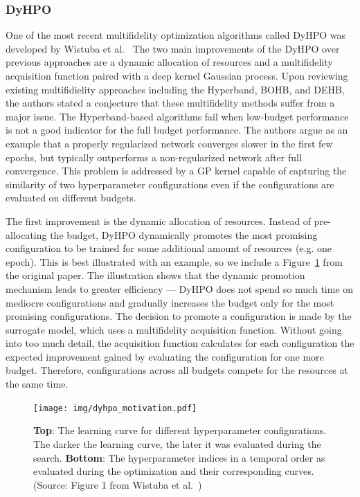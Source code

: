 \subsubsection{DyHPO}
One of the most recent multifidelity optimization algorithms called DyHPO was developed by Wistuba et al.~\cite{wistuba2022supervising} The two main improvements of the DyHPO over previous approaches are a dynamic allocation of resources and a multifidelity acquisition function paired with a deep kernel Gaussian process. Upon reviewing existing multifidielity approaches including the Hyperband, BOHB, and DEHB, the authors stated a conjecture that these multifidelity methods suffer from a major issue. The Hyperband-based algorithms fail when low-budget performance is not a good indicator for the full budget performance. The authors argue as an example that a properly regularized network converges slower in the first few epochs, but typically outperforms a non-regularized network after full convergence. This problem is addressed by a GP kernel capable of capturing the similarity of two hyperparameter configurations even if the configurations are evaluated on different budgets.

The first improvement is the dynamic allocation of resources. Instead of pre-allocating the budget, DyHPO dynamically promotes the most promising configuration to be trained for some additional amount of resources (e.g. one epoch). This is best illustrated with an example, so we include a Figure~\ref{fig:dyhpo_motivation} from the original paper. The illustration shows that the dynamic promotion mechanism leads to greater efficiency --- DyHPO does not spend so much time on mediocre configurations and gradually increases the budget only for the most promising configurations. The decision to promote a configuration is made by the surrogate model, which uses a multifidelity acquisition function. Without going into too much detail, the acquisition function calculates for each configuration the expected improvement gained by evaluating the configuration for one more budget. Therefore, configurations across all budgets compete for the resources at the same time.

\begin{figure}
    \centering
    \texttt{[image: img/dyhpo\_motivation.pdf]}
    \caption{\textbf{Top}: The learning curve for different hyperparameter configurations. The darker the learning curve, the later it was evaluated during the search. \textbf{Bottom}: The hyperparameter indices in a temporal order as evaluated during the optimization and their corresponding curves. (Source: Figure 1 from Wistuba et al.~\cite{wistuba2022supervising})}
    \label{fig:dyhpo_motivation}
\end{figure}

